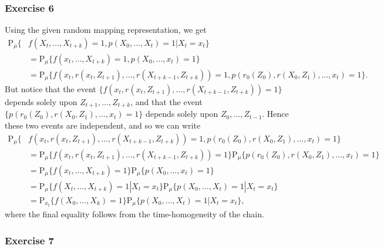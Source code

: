 \documentclass[12pt]{article}
\newcommand{\Prob}{\mathrm{P}}
\begin{document}
\subsubsection*{Exercise 6}

Using the given random mapping representation, we get
\begin{align*}
\Prob_\mu\{&f(X_t, \ldots, X_{t+k}) = 1, p(X_0, \ldots, X_t) = 1 | X_t = x_t\} \\
&= \Prob_\mu\{f(x_t, \ldots, X_{t+k}) = 1, p(X_0, \ldots, x_t) = 1\} \\
&= \Prob_\mu\{f(x_t, r(x_t, Z_{t+1}), \ldots, r(X_{t+k-1}, Z_{t+k})) = 1, p(r_0(Z_0), r(X_0, Z_1), \ldots, x_t) = 1\}.
\end{align*}
But notice that the event $\{f(x_t, r(x_t, Z_{t+1}), \ldots, r(X_{t+k-1}, Z_{t+k})) = 1\}$ depends solely upon $Z_{t+1}, \ldots, Z_{t+k}$, and that the event $\{p(r_0(Z_0), r(X_0, Z_1), \ldots, x_t) = 1\}$ depends solely upon $Z_0, \ldots, Z_{t-1}$. Hence these two events are independent, and so we can write
\begin{align*}
\Prob_\mu\{&f(x_t, r(x_t, Z_{t+1}), \ldots, r(X_{t+k-1}, Z_{t+k})) = 1, p(r_0(Z_0), r(X_0, Z_1), \ldots, x_t) = 1\} \\
&= \Prob_\mu\{f(x_t, r(x_t, Z_{t+1}), \ldots, r(X_{t+k-1}, Z_{t+k})) = 1\} \Prob_\mu\{p(r_0(Z_0), r(X_0, Z_1), \ldots, x_t) = 1\} \\
&= \Prob_\mu\{f(x_t, \ldots, X_{t+k}) = 1\} \Prob_\mu\{p(X_0, \ldots, x_t) = 1\} \\
&= \Prob_\mu\{f(X_t, \ldots, X_{t+k}) = 1 | X_t = x_t\} \Prob_\mu\{p(X_0, \ldots, X_t) = 1 | X_t = x_t\} \\
&= \Prob_{x_t}\{f(X_0, \ldots, X_k) = 1\} \Prob_\mu\{p(X_0, \ldots, X_t) = 1 | X_t = x_t\},
\end{align*}
where the final equality follows from the time-homogeneity of the chain.

\subsubsection*{Exercise 7}
\end{document}
